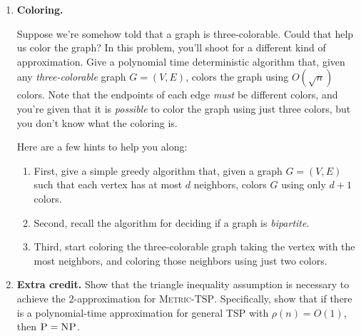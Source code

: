 \documentclass[11pt]{article}
\newcommand{\prob}[1]{\textsc{#1}\xspace}
\newcommand{\tsp}{\prob{TSP}}
\newcommand{\metrictsp}{\prob{Metric-TSP}}
\newcommand{\np}{\textsc{NP}\xspace}
\newcommand{\p}{\textsc{P}\xspace}
\begin{document}
\begin{enumerate}
\item {\bf Coloring.} 

  Suppose we're somehow told that a graph is
  three-colorable. Could that help us color the graph?  In this
  problem, you'll shoot for a different kind of approximation.  Give a
  polynomial time deterministic algorithm that, given any
  \emph{three-colorable} graph $G = (V,E)$, colors the graph using
  $O(\sqrt{n})$ colors.  Note that the endpoints of each edge
  \emph{must} be different colors, and you're given that it is
  \emph{possible} to color the graph using just three colors, but you
  don't know what the coloring is.

  Here are a few hints to help you along:
  \begin{enumerate}
  \item First, give a simple greedy algorithm that, given a graph $G =
    (V,E)$ such that each vertex has at most $d$ neighbors, colors $G$
    using only $d+1$ colors.
  \item Second, recall the algorithm for deciding if a graph is
    \emph{bipartite}.
  \item Third, start coloring the three-colorable graph taking the
    vertex with the most neighbors, and coloring those neighbors using
    just two colors.
  \end{enumerate}


  \item {\bf Extra credit.}
    Show that the triangle inequality assumption is necessary to
    achieve the $2$-approximation for \metrictsp.  Specifically, show
    that if there is a polynomial-time approximation for general \tsp
    with $\rho(n)=O(1)$, then $\p = \np$.
\end{enumerate}
\end{document}
